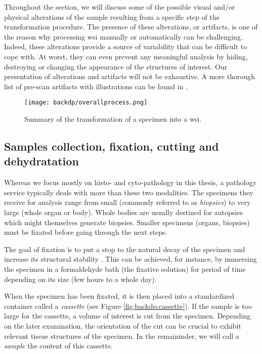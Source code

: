 Throughout the section, we will discuss some of the possible visual and/or physical alterations of the sample resulting from a specific step of the transformation procedure. The presence of these alterations, or artifacts, is one of the reason why processing \acrshort{wsi} manually or automatically can be challenging. Indeed, these alterations provide a source of variability that can be difficult to cope with. At worst, they can even prevent any meaningful analysis by hiding, destroying or changing the appearance of the structures of interest. Our presentation of alterations and artifacts will not be exhaustive. A more thorough list of pre-scan artifacts with illustrations can be found in \parencite{taqi2018review}. 


\begin{figure}
  \centering
  \texttt{[image: backdp/overallprocess.png]}
  \caption{Summary of the transformation of a specimen into a \acrlong{wsi}.}
  \label{fig:backdp:overallprocess}
\end{figure}

\subsection{Samples collection, fixation, cutting and dehydratation}

Whereas we focus mostly on histo- and cyto-pathology in this thesis, a pathology service typically deals with more than these two modalities. The specimens they receive for analysis range from small (commonly referred to as \textit{biopsies}) to very large (whole organ or body). Whole bodies are usually destined for autopsies which might themselves generate biopsies. Smaller specimens (organs, biopsies) must be fixated before going through the next steps. 

The goal of fixation is to put a stop to the natural decay of the specimen and increase its structural stability \parencite{rolls2012process}. This can be achieved, for instance, by immersing the specimen in a formaldehyde bath (\ie the fixative solution) for period of time depending on its size (\ie few hours to a whole day). 

When the specimen has been fixated, it is then placed into a standardized container called a \textit{cassette} (see Figure \ref{fig:backdp:cassette}). If the sample is too large for the cassette, a volume of interest is cut from the specimen. Depending on the later examination, the orientation of the cut can be crucial to exhibit relevant tissue structures of the specimen. In the remaininder, we will call a \textit{sample} the content of this cassette.

